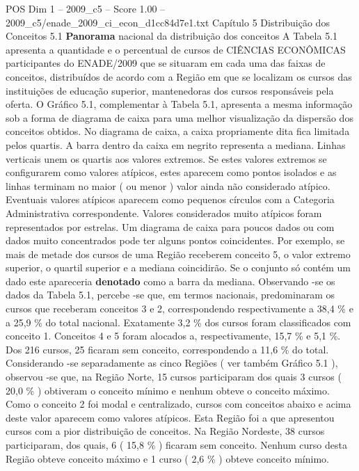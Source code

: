 \begin{textsample}{POS Dim 1 – 2009\_c5 – Score 1.00 – 2009\_c5/enade\_2009\_ci\_econ\_d1cc84d7e1.txt}  \label{ex:f1_pos_145}
Capítulo 5 Distribuição dos Conceitos 5.1 \textbf{Panorama} nacional da distribuição dos conceitos A Tabela 5.1 apresenta a quantidade e o percentual de cursos de CIÊNCIAS ECONÔMICAS participantes do ENADE/2009 que se situaram em cada uma das faixas de conceitos, distribuídos de acordo com a Região em que se localizam os cursos das instituições de educação superior, mantenedoras dos cursos responsáveis pela oferta.
O Gráfico 5.1, complementar à Tabela 5.1, apresenta a mesma informação sob a forma de diagrama de caixa para uma melhor visualização da dispersão dos conceitos obtidos.
No diagrama de caixa, a caixa propriamente dita fica limitada pelos quartis.
A barra dentro da caixa em negrito representa a mediana.
Linhas verticais unem os quartis aos valores extremos.
Se estes valores extremos se configurarem como valores atípicos, estes aparecem como pontos isolados e as linhas terminam no maior ( ou menor ) valor ainda não considerado atípico.
Eventuais valores atípicos aparecem como pequenos círculos com a Categoria Administrativa correspondente.
Valores considerados muito atípicos foram representados por estrelas.
Um diagrama de caixa para poucos dados ou com dados muito concentrados pode ter alguns pontos coincidentes.
Por exemplo, se mais de metade dos cursos de uma Região receberem conceito 5, o valor extremo superior, o quartil superior e a mediana coincidirão.
Se o conjunto só contém um dado este apareceria \textbf{denotado} como a barra da mediana.
Observando -se os dados da Tabela 5.1, percebe -se que, em termos nacionais, predominaram os cursos que receberam conceitos 3 e 2, correspondendo respectivamente a 38,4 \% e a 25,9 \% do total nacional.
Exatamente 3,2 \% dos cursos foram classificados com conceito 1.
Conceitos 4 e 5 foram alocados a, respectivamente, 15,7 \% e 5,1 \%.
Dos 216 cursos, 25 ficaram sem conceito, correspondendo a 11,6 \% do total.
Considerando -se separadamente as cinco Regiões ( ver também Gráfico 5.1 ), observou -se que, na Região Norte, 15 cursos participaram dos quais 3 cursos ( 20,0 \% ) obtiveram o conceito mínimo e nenhum obteve o conceito máximo.
Como o conceito 2 foi modal e centralizado, cursos com conceitos abaixo e acima deste valor aparecem como valores atípicos.
Esta Região foi a que apresentou cursos com a pior distribuição de conceitos.
Na Região Nordeste, 38 cursos participaram, dos quais, 6 ( 15,8 \% ) ficaram sem conceito.
Nenhum curso desta Região obteve conceito máximo e 1 curso ( 2,6 \% ) obteve conceito mínimo.

\end{textsample}
